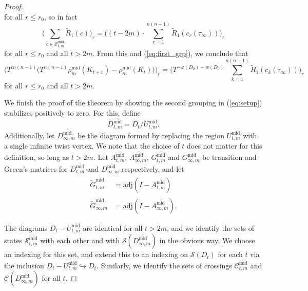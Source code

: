 \documentclass[11pt,hyp,]{nyjm}
\numberwithin{thm}{section}
\theoremstyle{definition}
\theoremstyle{remark}
\begin{document}
\begin{proof}
$$		$$
		for all $r\leq r_0$, so in fact
		$$
		\big( \sum_{c \in \mathcal{C}_{t,m}^\text{mid}} \tilde{R}_1(c) \big)_r = \big((t - 2m) \cdot \sum_{r = 1}^{n(n-1)} \widetilde{R}_1(c_r(\tau_\infty)) \big)_r
		$$
		for all $r \leq r_0$ and all $t > 2m$. From this and (\ref{eq:first_grp}), we conclude that
		\begin{equation}
			\label{eq:plugin}
			\Big( T^{tn(n - 1)} \big(T^{n(n - 1)} \rho^\text{mid}_m(K_{t + 1}) -  \rho^\text{mid}_m(K_t)\big) \Big)_r = \Big(T^{-\varphi(D_0) -w(D_0)} \sum_{k = 1}^{n(n-1)} \widetilde{R}_1(c_k(\tau_\infty)) \Big)_r
		\end{equation}
		for all $r \leq r_0$ and all $t > 2m$.
		
		We finish the proof of the theorem by showing the second grouping in (\ref{eq:setup}) stabilizes positively to zero. For this, define
		$$
		D^{\overline{\text{mid}}}_{t,m} = D_t/U^\text{mid}_{t,m}.
		$$
		Additionally, let $D^{\overline{\text{mid}}}_{\infty,m}$ be the diagram formed by replacing the region $U^\text{mid}_{t,m}$ with a single infinite twist vertex. We note that the choice of $t$ does not matter for this definition, so long as $t > 2m$. Let $A^{\overline{\text{mid}}}_{t,m}$, $A^{\overline{\text{mid}}}_{\infty,m}$, $G^{\overline{\text{mid}}}_{t,m}$ and $G^{\overline{\text{mid}}}_{\infty,m}$ be transition and Green's matrices for $D^{\overline{\text{mid}}}_{t,m}$ and $D^{\overline{\text{mid}}}_{\infty,m}$ respectively, and let
		\begin{align*}
		\widetilde{G}^{\overline{\text{mid}}}_{t,m} &= \text{adj}(I - A^{\overline{\text{mid}}}_{t,m}) \\
		\widetilde{G}^{\overline{\text{mid}}}_{\infty,m} &= \text{adj}(I - A^{\overline{\text{mid}}}_{\infty,m}).
		\end{align*}
	
		The diagrams $D_t - U^\text{mid}_{t,m}$ are identical for all $t > 2m$, and we identify the sets of states $\mathcal{S}_{t,m}^{\overline{\text{mid}}}$ with each other and with $\mathcal{S}(D^{\overline{\text{mid}}}_{\infty,m})$ in the obvious way. We choose an indexing for this set, and extend this to an indexing on $\mathcal{S}(D_t)$ for each $t$ via the inclusion $D_t - U^\text{mid}_{t,m} \hookrightarrow D_t$. Similarly, we identify the sets of crossings $\mathcal{C}^{\overline{\text{mid}}}_{t,m}$ and $\mathcal{C}(D^{\overline{\text{mid}}}_{\infty,m})$ for all $t$.
		

\end{proof}
\end{document}
